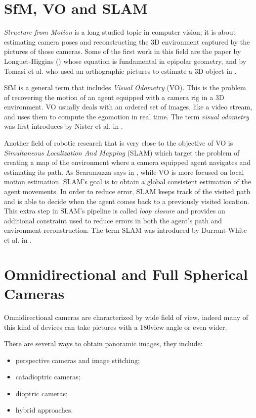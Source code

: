 \section{SfM, VO and SLAM}
\textit{Structure from Motion} is a long studied topic in computer vision; 
it is about estimating camera poses and 
reconstructing the 3D environment captured by the 
pictures of those cameras.
Some of the first work in this field are the paper by Longuet-Higgins 
(\cite{longuet1981computer}) whose equation is fundamental in epipolar geometry,
and by Tomasi et al. who used an orthographic pictures to estimate a 3D object 
in \cite{tomasi1992shape}.

SfM is a general term that includes \textit{Visual Odometry} (VO). This is 
the problem of recovering the motion of an agent equipped with a camera rig in 
a 3D environment. VO usually deals with an ordered set of images, like a video 
stream, and uses them to compute the egomotion in real time.
The term \textit{visual odometry} was first introduces by Nister et al. 
in \cite{nister2004visual}.

Another field of robotic research that is very close to the objective of VO is
\textit{Simultaneous Localization And Mapping} (SLAM) which target the problem 
of creating a map of the environment where a camera equipped agent navigates 
and estimating its path.
As Scaramuzza says in \cite{scaramuzzaVisualOdometryI}, while VO is more 
focused on local motion estimation, SLAM's goal is to obtain a global 
consistent estimation of the agent movements.
In order to reduce error, SLAM keeps track of the visited path and is able to 
decide when the agent comes back to a previously visited location.
This extra step in SLAM's pipeline is called \textit{loop closure} and provides 
an additional constraint used to reduce errors in both the agent's path and 
environment reconstruction.
The term SLAM was introduced by Durrant-White et al. in 
\cite{durrant1996localization}.

\section{Omnidirectional and Full Spherical Cameras}
\label{sec:cameraclassification}
Omnidirectional cameras are characterized by wide field of view, 
indeed many of this kind
of devices can take pictures with a 180\degree view angle or even wider.

There are several ways to obtain panoramic images, they include:
\begin{itemize}
	\item perspective cameras and image stitching;
	\item catadioptric cameras;
	\item dioptric cameras;
	\item hybrid approaches.
\end{itemize}

